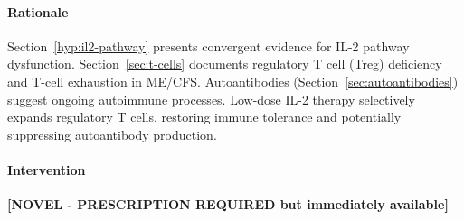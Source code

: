 \paragraph{Rationale}
Section~\ref{hyp:il2-pathway} presents convergent evidence for IL-2 pathway dysfunction. Section~\ref{sec:t-cells} documents regulatory T cell (Treg) deficiency and T-cell exhaustion in ME/CFS. Autoantibodies (Section~\ref{sec:autoantibodies}) suggest ongoing autoimmune processes. Low-dose IL-2 therapy selectively expands regulatory T cells, restoring immune tolerance and potentially suppressing autoantibody production.

\paragraph{Intervention}

\textbf{[NOVEL - PRESCRIPTION REQUIRED but immediately available]}

